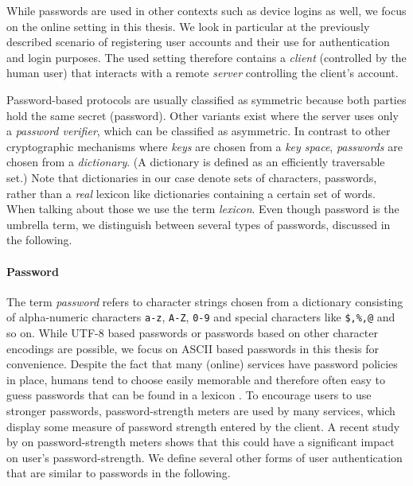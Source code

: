 While passwords are used in other contexts such as device logins as well, we focus on the online setting in this thesis.
We look in particular at the previously described scenario of registering user accounts and their use for authentication and login purposes.
The used setting therefore contains a \emph{client} (controlled by the human user) that interacts with a remote \emph{server} controlling the client's account.

Password-based protocols are usually classified as symmetric because both parties hold the same secret (password).
Other variants exist where the server uses only a \emph{password verifier}, which can be classified as asymmetric.
In contrast to other cryptographic mechanisms where \emph{keys} are chosen from a \emph{key space}, \emph{passwords} are chosen from a \emph{dictionary}.
(A dictionary is defined as an efficiently traversable set.)
Note that dictionaries in our case denote sets of characters, \ie passwords, rather than a \emph{real} lexicon like dictionaries containing a certain set of words.
When talking about those we use the term \emph{lexicon}.
Even though password is the umbrella term, we distinguish between several types of passwords, discussed in the following.

\paragraph{Password}
The term \emph{password} refers to character strings chosen from a dictionary consisting of alpha-numeric characters \texttt{a-z}, \texttt{A-Z}, \texttt{0-9} and special characters like \texttt{\$,\%,@} and so on.
While \acs{UTF-8} based passwords or passwords based on other character encodings are possible, we focus on \acs{ASCII} based passwords in this thesis for convenience.
Despite the fact that many (online) services have password policies in place, humans tend to choose easily memorable and therefore often easy to guess passwords that can be found in a lexicon \cite{Florencio2007,Gaw2006}.
To encourage users to use stronger passwords, password-strength meters are used by many services, which display some measure of password strength entered by the client.
A recent study by \citet{Ur2012} on password-strength meters shows that this could have a significant impact on user's password-strength.
We define several other forms of user authentication that are similar to passwords in the following.

